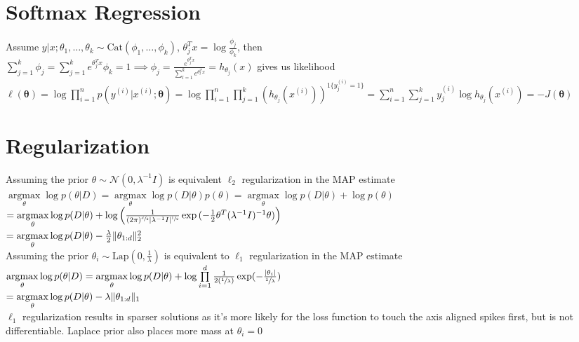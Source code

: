 \documentclass{article}
\newcommand{\N}{\mathcal{N}}
\DeclareMathOperator*{\argmax}{argmax}
\DeclarePairedDelimiter\abs{\lvert}{\rvert}
\DeclarePairedDelimiter\norm{\lVert}{\rVert}
\begin{document}
\section{Softmax Regression}
Assume $y|x ; \theta_1, \ldots, \theta_k \sim \mbox{Cat}(\phi_1, \ldots, \phi_k)$, $\theta_j^Tx = \log\frac{\phi_j}{\phi_k}$, then \\
$\sum\limits_{j=1}^k \phi_j = \sum\limits_{j=1}^k e^{\theta_j^Tx}\phi_k = 1 \implies \phi_j = \frac{e^{\theta_j^Tx}}{\sum_{l=1}^k e^{\theta_l^Tx}} = h_{\theta_j}(x)$ gives us likelihood \\
$\ell(\boldsymbol \theta) = \log \prod\limits_{i=1}^n p(y^{(i)} | x^{(i)} ; \boldsymbol \theta) = \log \prod\limits_{i=1}^n \prod\limits_{j=1}^k (h_{\theta_j}(x^{(i)}) )^{1\{y^{(i)}_j = 1\}} = \sum\limits_{i=1}^n \sum\limits_{j=1}^k y_j^{(i)}\log h_{\theta_j}(x^{(i)}) = - J(\boldsymbol \theta)$


\section{Regularization}
Assuming the prior $\theta \sim \N(0, \lambda^{-1}I)$ is equivalent $\ell_2$ regularization in the MAP estimate \\
$\argmax\limits_\theta \log p(\theta | D) = \argmax\limits_\theta \log p(D | \theta) p(\theta) = \argmax\limits_\theta \log p(D| \theta) + \log p(\theta)$ \\
\hspace*{2.717cm} $ = \argmax\limits_\theta \log p(D| \theta) + \log \Big(\frac{1}{(2\pi)^{\sfrac{d}{2}} \abs{\lambda^{-1}I}^{\sfrac{1}{2}}}\exp{(-\frac{1}{2} \theta^T (\lambda^{-1}I)^{-1} \theta)}\Big) $ \\
\hspace*{2.717cm} $ =\argmax\limits_\theta  \log p(D| \theta) - \frac{\lambda}{2}\norm {\theta_{1:d}}_2^2$ \\
Assuming the prior $\theta_i \sim \mbox{Lap}(0, \frac{1}{\lambda})$ is equivalent to $\ell_1$ regularization in the MAP estimate \\
$\argmax\limits_\theta \log p(\theta | D) = \argmax\limits_\theta \log p(D| \theta) + \log \prod\limits_{i=1}^d \frac{1}{2 (\sfrac{1}{\lambda})}\exp (-\frac{\abs{ \theta_i}}{\sfrac{1}{\lambda}})$ \\
\hspace*{2.717cm} $ =  \argmax\limits_\theta \log p(D| \theta) -\lambda \norm{\theta_{1:d}}_1$ \\
$\ell_1$ regularization results in sparser solutions as it's more likely for the loss function to touch the axis aligned spikes first, but is not differentiable. Laplace prior also places more mass at $\theta_i = 0$ 
\end{document}
